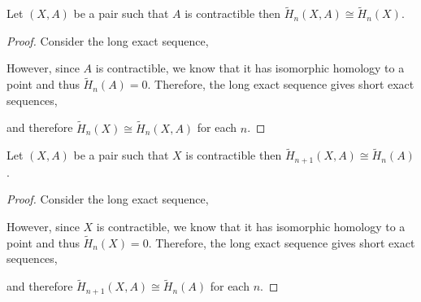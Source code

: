 \documentclass[12pt]{extarticle}
\begin{document}
\begin{lemma} \label{contractible_pair}
Let $(X, A)$ be a pair such that $A$ is contractible then $\tilde{H}_n(X, A) \cong \tilde{H}_n(X)$.
\end{lemma}

\begin{proof}
Consider the long exact sequence,

\begin{center}
\end{center} 
However, since $A$ is contractible, we know that it has isomorphic homology to a point and thus $\tilde{H}_n(A) = 0$. Therefore, the long exact sequence gives short exact sequences,
\begin{center}
\end{center} 
and therefore $\tilde{H}_n(X) \cong \tilde{H}_{n}(X, A)$ for each $n$.
\end{proof}

\begin{lemma} \label{contractible_base}
Let $(X, A)$ be a pair such that $X$ is contractible then $\tilde{H}_{n+1}(X, A) \cong \tilde{H}_{n}(A)$.
\end{lemma}

\begin{proof}
Consider the long exact sequence,

\begin{center}
\end{center} 
However, since $X$ is contractible, we know that it has isomorphic homology to a point and thus $\tilde{H}_n(X) = 0$. Therefore, the long exact sequence gives short exact sequences,
\begin{center}
\end{center} 
and therefore $\tilde{H}_{n+1}(X, A) \cong \tilde{H}_{n}(A)$ for each $n$.
\end{proof}
\end{document}
